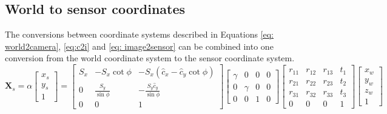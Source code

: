 \documentclass[12pt,oneside,openany,a4paper, %
english, %
masters-t, goldenblock]{usthesis}
\begin{document}
\subsection{World to sensor coordinates}
The conversions between coordinate systems described in Equations \ref{eq: world2camera}, \ref{eq:c2i} and \ref{eq: image2sensor} can be combined into one conversion from the world coordinate system to the sensor coordinate system.
\begin{equation}
  \bm{X}_s = \alpha
  \begin{bmatrix}
  x_s \\
  y_s \\
  1
  \end{bmatrix} =
  \begin{bmatrix}
  S_x & -S_x \cot \phi & -S_x \left( \hat c_x - \hat c_y \cot \phi \right) \\
  0 & \frac{S_y}{\sin \phi} & -\frac{S_y \hat c_y}{\sin \phi} \\
  0 & 0 & 1
  \end{bmatrix}
  \begin{bmatrix}
  \gamma & 0 & 0 & 0 \\
  0 & \gamma & 0 & 0 \\
  0 & 0 & 1 & 0
  \end{bmatrix}
  \begin{bmatrix}
  r_{11} & r_{12} & r_{13} & t_1 \\
  r_{21} & r_{22} & r_{23} & t_2 \\
  r_{31} & r_{32} & r_{33} & t_3 \\
  0 & 0 & 0 & 1
  \end{bmatrix}
  \begin{bmatrix}
  x_w \\
  y_w \\
  z_w \\
  1
  \end{bmatrix}
\end{equation}
\end{document}

